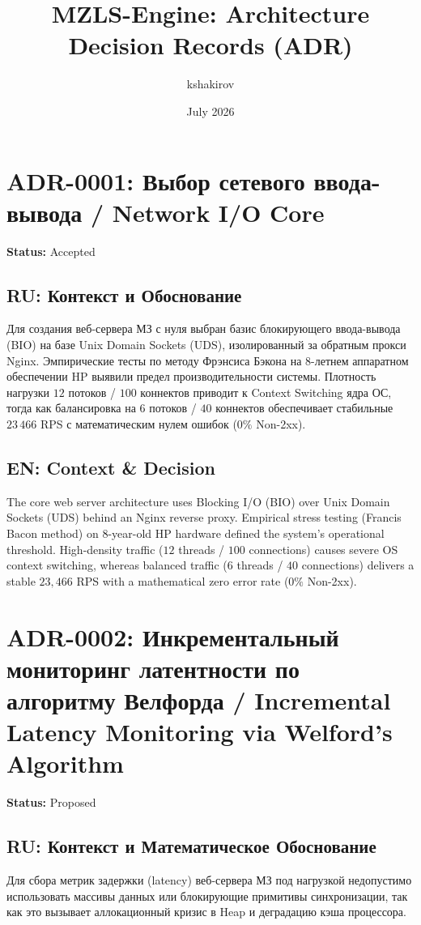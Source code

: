 \documentclass[12pt,a4paper]{article}
\title{MZLS-Engine: Architecture Decision Records (ADR)}
\author{kshakirov}
\date{July 2026}
\begin{document}
\maketitle

\section*{ADR-0001: Выбор сетевого ввода-вывода / Network I/O Core}
\textbf{Status:} Accepted \\

\subsection*{RU: Контекст и Обоснование}
Для создания веб-сервера МЗ с нуля выбран базис блокирующего ввода-вывода (BIO) на базе Unix Domain Sockets (UDS), изолированный за обратным прокси Nginx. 
Эмпирические тесты по методу Фрэнсиса Бэкона на 8-летнем аппаратном обеспечении HP выявили предел производительности системы. Плотность нагрузки $12$ потоков / $100$ коннектов приводит к Context Switching ядра ОС, тогда как балансировка на $6$ потоков / $40$ коннектов обеспечивает стабильные $23\,466$ RPS с математическим нулем ошибок ($0\%$ Non-2xx).

\subsection*{EN: Context \& Decision}
The core web server architecture uses Blocking I/O (BIO) over Unix Domain Sockets (UDS) behind an Nginx reverse proxy. 
Empirical stress testing (Francis Bacon method) on 8-year-old HP hardware defined the system's operational threshold. High-density traffic ($12$ threads / $100$ connections) causes severe OS context switching, whereas balanced traffic ($6$ threads / $40$ connections) delivers a stable $23,466$ RPS with a mathematical zero error rate ($0\%$ Non-2xx).




\section*{ADR-0002: Инкрементальный мониторинг латентности по алгоритму Велфорда / Incremental Latency Monitoring via Welford's Algorithm}
\textbf{Status:} Proposed \\

\subsection*{RU: Контекст и Математическое Обоснование}
Для сбора метрик задержки (latency) веб-сервера МЗ под нагрузкой недопустимо использовать массивы данных или блокирующие примитивы синхронизации, так как это вызывает аллокационный кризис в Heap и деградацию кэша процессора. 
\end{document}
